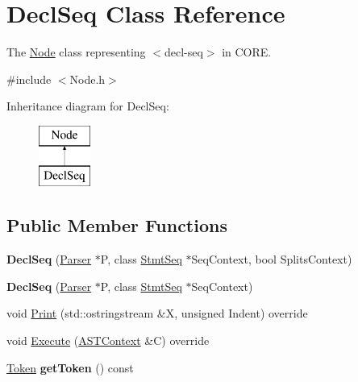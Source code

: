 \hypertarget{class_decl_seq}{}\section{Decl\+Seq Class Reference}
\label{class_decl_seq}


The \mbox{\hyperlink{class_node}{Node}} class representing {\ttfamily $<$decl-\/seq$>$} in C\+O\+RE.  




{\ttfamily \#include $<$Node.\+h$>$}

Inheritance diagram for Decl\+Seq\+:\begin{figure}[H]
\begin{center}
\leavevmode
\includegraphics[height=2.000000cm]{class_decl_seq}
\end{center}
\end{figure}
\subsection*{Public Member Functions}
\begin{DoxyCompactItemize}
\item 
\mbox{\label{class_decl_seq_ac672d0fdc95d75a1a7b80bd8f3ba7ba7}} 
{\bfseries Decl\+Seq} (\mbox{\hyperlink{class_parser}{Parser}} $\ast$P, class \mbox{\hyperlink{class_stmt_seq}{Stmt\+Seq}} $\ast$Seq\+Context, bool Splits\+Context)
\item 
\mbox{\label{class_decl_seq_a1ef2b90e633d78472d75b077556e7a1d}} 
{\bfseries Decl\+Seq} (\mbox{\hyperlink{class_parser}{Parser}} $\ast$P, class \mbox{\hyperlink{class_stmt_seq}{Stmt\+Seq}} $\ast$Seq\+Context)
\item 
void \mbox{\hyperlink{class_decl_seq_a028dc9916d5ab8369117d90b9e7af7f8}{Print}} (std\+::ostringstream \&X, unsigned Indent) override
\item 
void \mbox{\hyperlink{class_decl_seq_acf5b28c6f7705ec9dc5d587ad5edf9da}{Execute}} (\mbox{\hyperlink{class_a_s_t_context}{A\+S\+T\+Context}} \&C) override
\item 
\mbox{\label{class_decl_seq_ac78a1d481b2e89eb4903979febe99f3c}} 
\mbox{\hyperlink{class_token}{Token}} {\bfseries get\+Token} () const
\end{DoxyCompactItemize}
